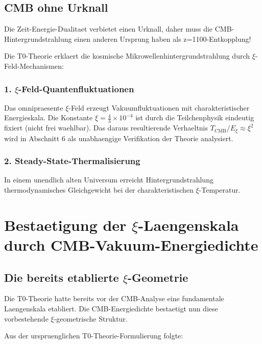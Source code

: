 \documentclass[12pt,a4paper]{article}
\begin{document}
	\subsection{CMB ohne Urknall}
	
	\begin{revolutionary}
		Die Zeit-Energie-Dualitaet verbietet einen Urknall, daher muss die CMB-Hintergrundstrahlung einen anderen Ursprung haben als z=1100-Entkopplung!
	\end{revolutionary}
	
	Die T0-Theorie erklaert die kosmische Mikrowellenhintergrundstrahlung durch $\xi$-Feld-Mechanismen:
	
	\subsubsection{1. $\xi$-Feld-Quantenfluktuationen}
	Das omnipraesente $\xi$-Feld erzeugt Vakuumfluktuationen mit charakteristischer Energieskala. Die Konstante $\xi = \frac{4}{3} \times 10^{-4}$ ist durch die Teilchenphysik eindeutig fixiert (nicht frei waehlbar). Das daraus resultierende Verhaeltnis $T_{\text{CMB}}/E_\xi \approx \xi^2$ wird in Abschnitt 6 als unabhaengige Verifikation der Theorie analysiert.
	
	\subsubsection{2. Steady-State-Thermalisierung}
	In einem unendlich alten Universum erreicht Hintergrundstrahlung thermodynamisches Gleichgewicht bei der charakteristischen $\xi$-Temperatur.
	
	\section{Bestaetigung der $\xi$-Laengenskala durch CMB-Vakuum-Energiedichte}
	
	\subsection{Die bereits etablierte $\xi$-Geometrie}
	
	\begin{important}
		Die T0-Theorie hatte bereits vor der CMB-Analyse eine fundamentale Laengenskala etabliert. Die CMB-Energiedichte bestaetigt nun diese vorbestehende $\xi$-geometrische Struktur.
	\end{important}
	
	Aus der urspruenglichen T0-Theorie-Formulierung folgte:
	
\end{document}
